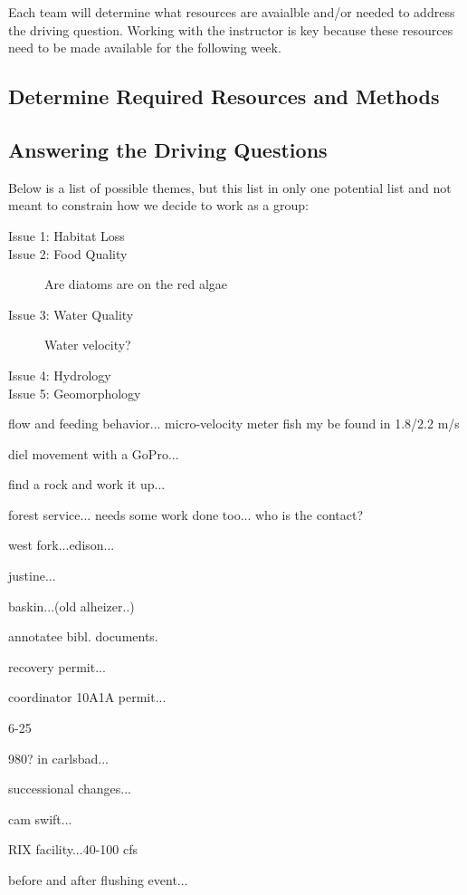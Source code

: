 \documentclass{article}\usepackage[]{graphicx}\usepackage[]{color}
\begin{document}
Each team will determine what resources are avaialble and/or needed to address the driving question. Working with the instructor is key because these resources need to be made available for the following week.

\subsection{Determine Required Resources and Methods}


\subsection{Answering the Driving Questions}




Below is a list of possible themes, but this list in only one potential list and not meant to constrain how we decide to work as a group: 

\begin{description}
  \item[Issue 1: Habitat Loss] 
  \item[Issue 2: Food Quality] Are diatoms are on the red algae
  \item[Issue 3: Water Quality] Water velocity?
  \item[Issue 4: Hydrology]
  \item[Issue 5: Geomorphology]
\end{description}

flow and feeding behavior... micro-velocity meter fish my be found in 1.8/2.2 m/s

diel movement with a GoPro...

find a rock and work it up...

forest service... needs some work done too... who is the contact?

west fork...edison... 

justine...

baskin...(old alheizer..)

annotatee bibl. documents.

recovery permit...

coordinator 10A1A permit...

6-25


980? in carlsbad...

successional changes...

cam swift...

RIX facility...40-100 cfs

before and after flushing event...
\end{document}
